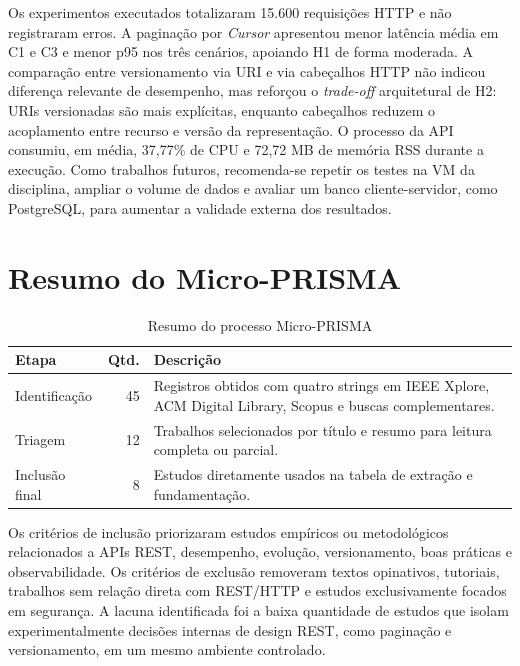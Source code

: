 \documentclass[journal]{IEEEtran}
\begin{document}
Os experimentos executados totalizaram 15.600 requisições HTTP e não registraram erros. A paginação por \textit{Cursor} apresentou menor latência média em C1 e C3 e menor p95 nos três cenários, apoiando H1 de forma moderada. A comparação entre versionamento via URI e via cabeçalhos HTTP não indicou diferença relevante de desempenho, mas reforçou o \textit{trade-off} arquitetural de H2: URIs versionadas são mais explícitas, enquanto cabeçalhos reduzem o acoplamento entre recurso e versão da representação. O processo da API consumiu, em média, 37,77\% de CPU e 72,72 MB de memória RSS durante a execução. Como trabalhos futuros, recomenda-se repetir os testes na VM da disciplina, ampliar o volume de dados e avaliar um banco cliente-servidor, como PostgreSQL, para aumentar a validade externa dos resultados.

\appendices

\section{Resumo do Micro-PRISMA}

\begin{table}[htbp]
\caption{Resumo do processo Micro-PRISMA}
\label{tab:micro_prisma}
\centering
\renewcommand{\arraystretch}{1.2}
\begin{tabularx}{\columnwidth}{l r X}
\toprule
\textbf{Etapa} & \textbf{Qtd.} & \textbf{Descrição} \\
\midrule
Identificação & 45 & Registros obtidos com quatro strings em IEEE Xplore, ACM Digital Library, Scopus e buscas complementares. \\
Triagem & 12 & Trabalhos selecionados por título e resumo para leitura completa ou parcial. \\
Inclusão final & 8 & Estudos diretamente usados na tabela de extração e fundamentação. \\
\bottomrule
\end{tabularx}
\end{table}

Os critérios de inclusão priorizaram estudos empíricos ou metodológicos relacionados a APIs REST, desempenho, evolução, versionamento, boas práticas e observabilidade. Os critérios de exclusão removeram textos opinativos, tutoriais, trabalhos sem relação direta com REST/HTTP e estudos exclusivamente focados em segurança. A lacuna identificada foi a baixa quantidade de estudos que isolam experimentalmente decisões internas de design REST, como paginação e versionamento, em um mesmo ambiente controlado.
\end{document}
